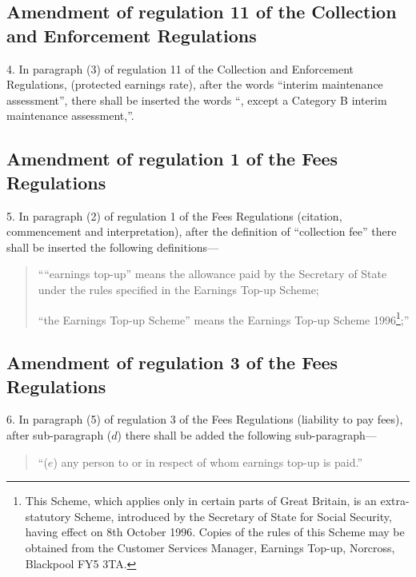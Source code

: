 \documentclass[12pt,a4paper]{article}
\begin{document}
\subsection[4. Amendment of regulation 11 of the Collection and Enforcement Regulations]{Amendment of regulation 11 of the Collection and Enforcement Regulations}

4.  In paragraph (3) of regulation 11 of the Collection and Enforcement Regulations, (protected earnings rate), after the words “interim maintenance assessment”, there shall be inserted the words “, except a Category B interim maintenance assessment,”.

\subsection[5. Amendment of regulation 1 of the Fees Regulations]{Amendment of regulation 1 of the Fees Regulations}

5.  In paragraph (2) of regulation 1 of the Fees Regulations (citation, commencement and interpretation), after the definition of “collection fee” there shall be inserted the following definitions—
\begin{quotation}
““earnings top-up” means the allowance paid by the Secretary of State under the rules specified in the Earnings Top-up Scheme;

“the Earnings Top-up Scheme” means the Earnings Top-up Scheme 1996\footnote{\frenchspacing This Scheme, which applies only in certain parts of Great Britain, is an extra-statutory Scheme, introduced by the Secretary of State for Social Security, having effect on 8th October 1996. Copies of the rules of this Scheme may be obtained from the Customer Services Manager, Earnings Top-up, Norcross, Blackpool FY5 3TA.};”
\end{quotation}

\subsection[6. Amendment of regulation 3 of the Fees Regulations]{Amendment of regulation 3 of the Fees Regulations}

6.  In paragraph (5) of regulation 3 of the Fees Regulations (liability to pay fees), after sub-paragraph ($d$) there shall be added the following sub-paragraph—
\begin{quotation}
“($e$) any person to or in respect of whom earnings top-up is paid.”
\end{quotation}
\end{document}
